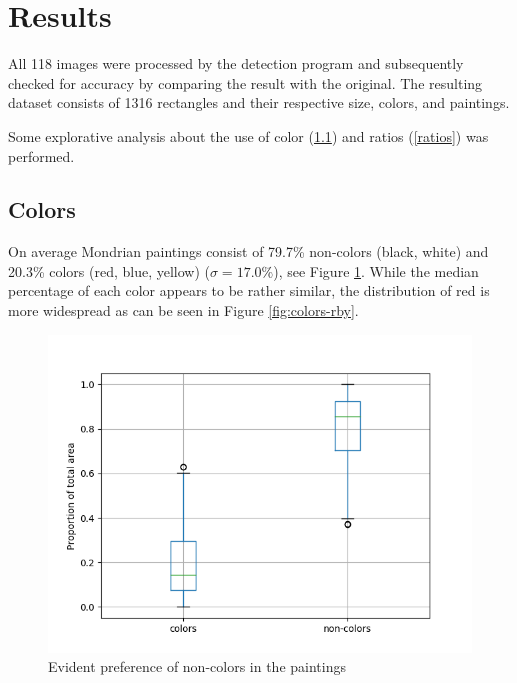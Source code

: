 \documentclass[serif,article,noparskip]{agse-thesis}
\begin{document}
\section{Results} \label{results}

 All 118 images were processed by the detection program and subsequently checked
 for accuracy by comparing the result with the original. The resulting dataset
 consists of 1316 rectangles and their respective size, colors, and paintings.

Some explorative analysis about the use of color (\ref{color}) and ratios
(\ref{ratios}) was performed.

\subsection{Colors} \label{color}

On average Mondrian paintings consist of 79.7\% non-colors (black, white) and
20.3\% colors (red, blue, yellow) ($\sigma = 17.0\%$), see Figure
\ref{fig:colors-noncolors}. While the median percentage of each color appears to
be rather similar, the distribution of red is more widespread as can be seen in
Figure \ref{fig:colors-rby}.

\begin{figure}
\includegraphics[width=\linewidth]{images/colors-non-colors.png}
\caption{Evident preference of non-colors in the paintings}
\label{fig:colors-noncolors}
\end{figure}
\end{document}
